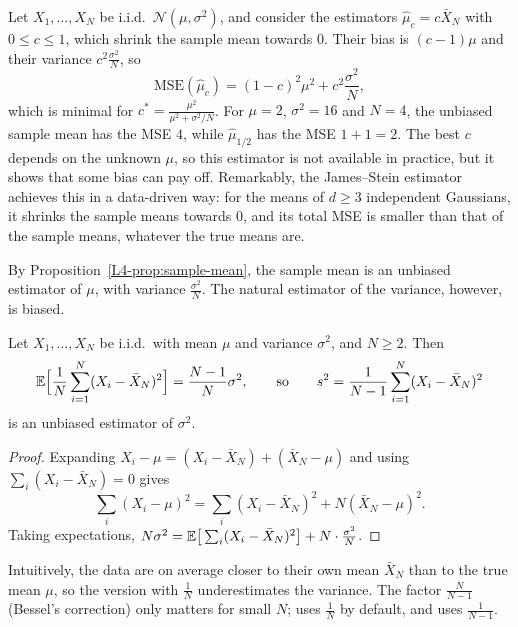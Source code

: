 \begin{example}[Shrinkage]\label{L4-ex:shrinkage}
    Let $X_1, \ldots, X_N$ be i.i.d.\ $\mathcal{N}(\mu, \sigma^2)$, and consider the estimators $\hat\mu_c = c\bar X_N$ with $0 \leq c \leq 1$, which shrink the sample mean towards $0$. Their bias is $(c - 1)\mu$ and their variance $c^2\frac{\sigma^2}{N}$, so
    \[\mathrm{MSE}(\hat\mu_c) = (1 - c)^2\mu^2 + c^2\frac{\sigma^2}{N},\]
    which is minimal for $c^* = \frac{\mu^2}{\mu^2 + \sigma^2/N}$. For $\mu = 2$, $\sigma^2 = 16$ and $N = 4$, the unbiased sample mean has the MSE $4$, while $\hat\mu_{1/2}$ has the MSE $1 + 1 = 2$. The best $c$ depends on the unknown $\mu$, so this estimator is not available in practice, but it shows that some bias can pay off. Remarkably, the James--Stein estimator achieves this in a data-driven way: for the means of $d \geq 3$ independent Gaussians, it shrinks the sample means towards $0$, and its total MSE is smaller than that of the sample means, whatever the true means are.
\end{example}

By Proposition~\ref{L4-prop:sample-mean}, the sample mean is an unbiased estimator of $\mu$, with variance $\frac{\sigma^2}{N}$. The natural estimator of the variance, however, is biased.

\begin{proposition}\label{L4-prop:sample-variance}
    Let $X_1, \ldots, X_N$ be i.i.d.\ with mean $\mu$ and variance $\sigma^2$, and $N \geq 2$. Then
    \[\mathbb{E}\Big[\frac{1}{N}\sum_{i=1}^N (X_i - \bar X_N)^2\Big] = \frac{N - 1}{N}\sigma^2, \qquad \text{so} \qquad s^2 = \frac{1}{N - 1}\sum_{i=1}^N (X_i - \bar X_N)^2\]
    is an unbiased estimator of $\sigma^2$.
\end{proposition}

\begin{proof}
    Expanding $X_i - \mu = (X_i - \bar X_N) + (\bar X_N - \mu)$ and using $\sum_i (X_i - \bar X_N) = 0$ gives
    \[\sum_i (X_i - \mu)^2 = \sum_i (X_i - \bar X_N)^2 + N(\bar X_N - \mu)^2.\]
    Taking expectations, $N\sigma^2 = \mathbb{E}\big[\sum_i (X_i - \bar X_N)^2\big] + N \cdot \frac{\sigma^2}{N}$.
\end{proof}

Intuitively, the data are on average closer to their own mean $\bar X_N$ than to the true mean $\mu$, so the version with $\frac{1}{N}$ underestimates the variance. The factor $\frac{N}{N - 1}$ (Bessel's correction) only matters for small $N$;  uses $\frac{1}{N}$ by default, and  uses $\frac{1}{N - 1}$.

